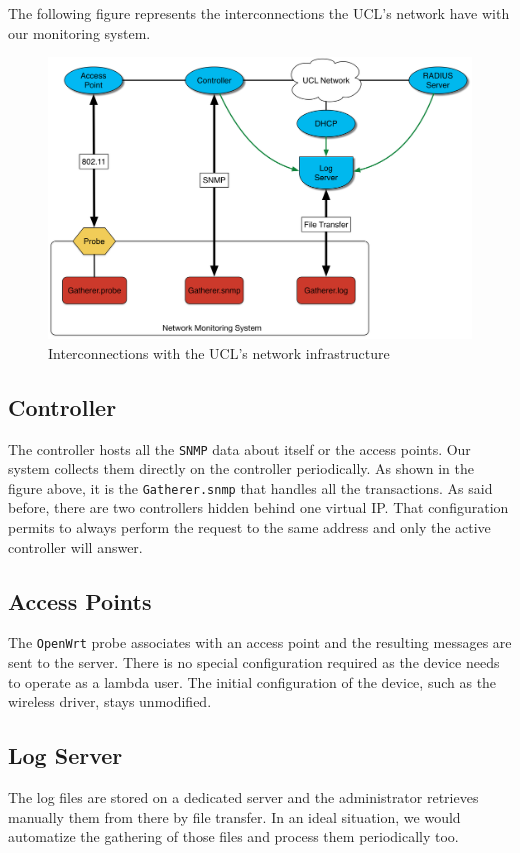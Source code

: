 The following figure represents the interconnections the UCL's network have with our monitoring system.

\begin{figure}[H]
\centering
	\includegraphics[width=1\linewidth]{Pictures/chapter3/interactions.png}
	\caption{Interconnections with the UCL's network infrastructure}
\end{figure}


\subsection{Controller}
The controller hosts all the \texttt{SNMP} data about itself or the access points. Our system collects them directly on the controller periodically. As shown in the figure above, it is the \texttt{Gatherer.snmp} that handles all the transactions. As said before, there are two controllers hidden behind one virtual IP. That configuration permits to always perform the request to the same address and only the active controller will answer.

\subsection{Access Points}
The \texttt{OpenWrt}  probe associates with an access point and the resulting messages are sent to the server. There is no special configuration required as the device needs to operate as a lambda user. The initial configuration of the device, such as the wireless driver, stays unmodified.

\subsection{Log Server} 
The log files are stored on a dedicated server and the administrator retrieves manually them from there by file transfer. In an ideal situation, we would automatize the gathering of those files and process them periodically too.

